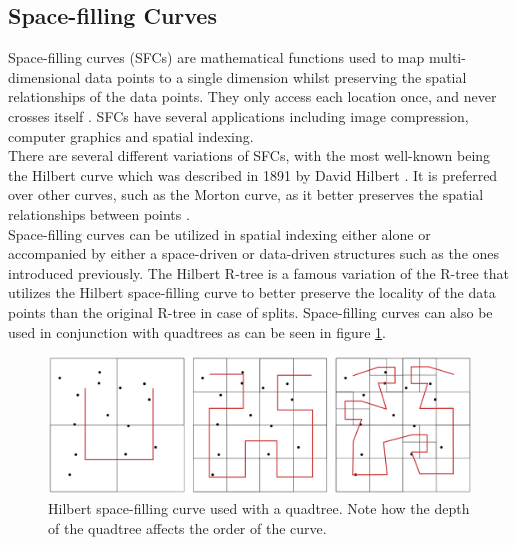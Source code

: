 \subsection{Space-filling Curves}
Space-filling curves (SFCs) are mathematical functions used to map multi-dimensional data points to a single dimension whilst preserving the spatial relationships of the data points. They only access each location once, and never crosses itself \cite{hilbert_r_tree_original}. SFCs have several applications including image compression, computer graphics and spatial indexing. \\

There are several different variations of SFCs, with the most well-known being the Hilbert curve which was described in 1891 by David Hilbert \cite{hilbert_curve}. It is preferred over other curves, such as the Morton curve, as it better preserves the spatial relationships between points \cite{spatial_data_structures}. \\

Space-filling curves can be utilized in spatial indexing either alone or accompanied by either a space-driven or data-driven structures such as the ones introduced previously. The Hilbert R-tree is a famous variation of the R-tree that utilizes the Hilbert space-filling curve to better preserve the locality of the data points than the original R-tree in case of splits. Space-filling curves can also be used in conjunction with quadtrees as can be seen in figure \ref{fig:space_filling_curve}.

\begin{figure}
	\centering
	\includegraphics[width=\textwidth]{figures/space_filling_curve.excalidraw.png}
	\caption{Hilbert space-filling curve used with a quadtree. Note how the depth of the quadtree affects the order of the curve.}
	\label{fig:space_filling_curve}
\end{figure}

